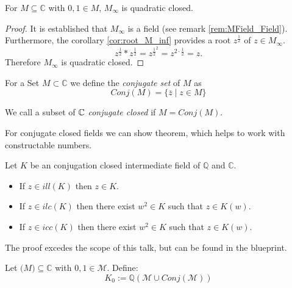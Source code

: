 \begin{lemma}
    \label{lem:M_inf_quad_closed}
    \leanok
    For $M\subseteq \mathbb{C}$ with $0,1 \in M$, $M_{\infty}$ is quadratic closed.
\end{lemma}
\begin{proof}
    \leanok
    It is established that $M_{\infty}$ is a field (see remark \ref{rem:MField_Field}). Furthermore, the corollary \ref{cor:root_M_inf} provides a root $z^{\frac{1}{2}}$ of $z \in M_{\infty}$.    
    $$ z^{\frac{1}{2}} * z^{\frac{1}{2}} = z^{\frac{1}{2}^2} = z^{2\cdot \frac{1}{2}} = z.$$
    Therefore $M_{\infty}$ is quadratic closed.
\end{proof}

\begin{definition}
    \label{def:conj_set}
    \leanok
    For a Set $M \subset \mathbb{C}$ we define the \emph{conjugate set} of $M$ as 
    \begin{equation*}
        Conj(M) = \{\overline{z}\mid z\in M\}
    \end{equation*}
\end{definition}

\begin{definition}
    \label{def:conj_closed}
    \leanok
    We call a subset of $\mathbb{C}$ \emph{conjugate closed} if $M= Conj(M)$.
\end{definition}

For conjugate closed fields we can show theorem, which helps to work with constructable numbers.
\begin{theorem}
    Let $K$ be an conjugation closed intermediate field of $\mathbb{Q}$ and $\mathbb{C}$.
    \begin{itemize}
        \item If $z\in ill(K)$ then $z\in K$.
        \item If $z\in ilc(K)$ then there exist $w^2 \in K$ such that $z\in K(w)$.
        \item If $z\in icc(K)$ then there exist $w^2 \in K$ such that $z\in K(w)$.
    \end{itemize}
\end{theorem}
The proof excedes the scope of this talk, but can be found in the blueprint.


\begin{definition}
    \label{def:K_M_0}
    \leanok
    Let $\mathcal(M)\subseteq\mathbb{C}$ with $0,1 \in \mathcal{M}$. Define:
    \begin{equation*}
        K_0 := \mathbb{Q}(\mathcal{M}\cup Conj(\mathcal{M}))
    \end{equation*}
\end{definition}


